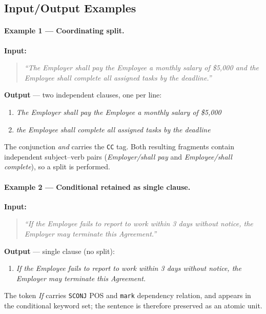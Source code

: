 \documentclass[assignment.tex]{subfiles}
\begin{document}
\subsection{Input/Output Examples}

\paragraph{Example 1 — Coordinating split.}

\noindent\textbf{Input:}
\begin{quote}
    \textit{``The Employer shall pay the Employee a monthly salary of \$5,000 and
    the Employee shall complete all assigned tasks by the deadline.''}
\end{quote}

\noindent\textbf{Output} — two independent clauses, one per line:
\begin{enumerate}
    \item \textit{The Employer shall pay the Employee a monthly salary of \$5,000}
    \item \textit{the Employee shall complete all assigned tasks by the deadline}
\end{enumerate}

The conjunction \textit{and} carries the \texttt{CC} tag.  Both resulting fragments
contain independent subject--verb pairs (\textit{Employer/shall pay} and
\textit{Employee/shall complete}), so a split is performed.

\paragraph{Example 2 — Conditional retained as single clause.}

\noindent\textbf{Input:}
\begin{quote}
    \textit{``If the Employee fails to report to work within 3 days without notice,
    the Employer may terminate this Agreement.''}
\end{quote}

\noindent\textbf{Output} — single clause (no split):
\begin{enumerate}
    \item \textit{If the Employee fails to report to work within 3 days without
    notice, the Employer may terminate this Agreement.}
\end{enumerate}

The token \textit{If} carries \texttt{SCONJ} POS and \texttt{mark} dependency
relation, and appears in the conditional keyword set; the sentence is therefore
preserved as an atomic unit.
\end{document}
